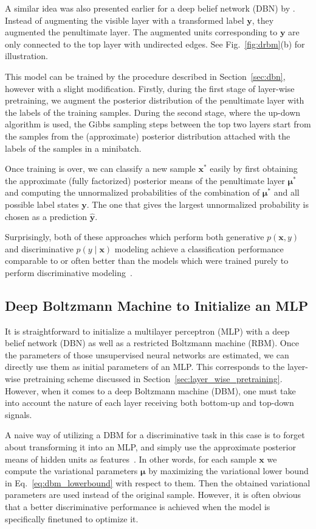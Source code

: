\documentclass{now}
\newcommand{\vect}[1]{\mathbf{#1}}
\newcommand{\vects}[1]{\boldsymbol{#1}}
\newcommand{\vx}[0]{\vect{x}}
\newcommand{\vy}[0]{\vect{y}}
\newcommand{\vmu}[0]{\vects{\mu}}
\begin{document}
A similar idea was also presented earlier for a deep belief network (DBN) by
\citet{Hinton2006nc}. Instead of augmenting the visible layer with a transformed
label $\vy$, they augmented the penultimate layer. The augmented units
corresponding to $\vy$ are only connected to the top layer with undirected
edges. See Fig.~\ref{fig:drbm}(b) for illustration.

This model can be trained by the procedure described in Section~\ref{sec:dbn},
however with a slight modification.  Firstly, during the first stage of
layer-wise pretraining, we augment the posterior distribution of the penultimate
layer with the labels of the training samples. During the second stage, where
the up-down algorithm is used, the Gibbs sampling steps between the top two
layers start from the samples from the (approximate) posterior distribution
attached with the labels of the samples in a minibatch. 

Once training is over, we can classify a new sample $\vx^*$ easily by first
obtaining the approximate (fully factorized) posterior means of the penultimate
layer $\vmu^*$ and computing the unnormalized probabilities of the combination
of $\vmu^*$ and all possible label states $\vy$. The one that gives the largest
unnormalized probability is chosen as a prediction $\hat{\vy}$.

Surprisingly, both of these approaches which perform both generative $p(\vx, y)$
and discriminative $p(y \mid \vx)$ modeling achieve a classification performance
comparable to or often better than the models which were trained purely to
perform discriminative modeling~\citep{Hinton2006nc,Larochelle2008}.

\subsection{Deep Boltzmann Machine to Initialize an MLP}
\label{sec:mlp_dbm}

It is straightforward to initialize a multilayer perceptron (MLP) with a deep
belief network (DBN) as well as a restricted Boltzmann machine (RBM). Once the
parameters of those unsupervised neural networks are estimated, we can directly
use them as initial parameters of an MLP. This corresponds to the layer-wise
pretraining scheme discussed in Section~\ref{sec:layer_wise_pretraining}.
However, when it comes to a deep Boltzmann machine (DBM), one must take into
account the nature of each layer receiving both bottom-up and top-down signals.

A naive way of utilizing a DBM for a discriminative task in this case is to
forget about transforming it into an MLP, and simply use the approximate
posterior means of hidden units as features~\citep[see,
e.g.,][]{Montavon2012ai,Cho13ICANN}. In other words, for each sample $\vx$ we
compute the variational parameters $\vmu$ by maximizing the variational lower
bound in Eq.~\eqref{eq:dbm_lowerbound} with respect to them. Then the obtained
variational parameters are used instead of the original sample.  However, it is
often obvious that a better discriminative performance is achieved when the
model is specifically finetuned to optimize it.
\end{document}
